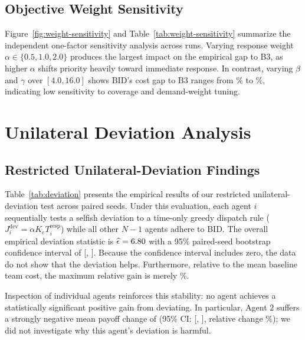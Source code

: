\documentclass{article}
\begin{document}
\subsection{Objective Weight Sensitivity}
Figure~\ref{fig:weight-sensitivity} and Table~\ref{tab:weight-sensitivity} summarize the independent one-factor sensitivity analysis across \NWeightRuns{} runs. Varying response weight $\alpha \in \{0.5, 1.0, 2.0\}$ produces the largest impact on the empirical gap to B3, as higher $\alpha$ shifts priority heavily toward immediate response. In contrast, varying $\beta$ and $\gamma$ over $[4.0, 16.0]$ shows BID's cost gap to B3 ranges from \BetaGammaMinGapPercent\% to \BetaGammaMaxGapPercent\%, indicating low sensitivity to coverage and demand-weight tuning.


%




\section{Unilateral Deviation Analysis}
\subsection{Restricted Unilateral-Deviation Findings}
Table~\ref{tab:deviation} presents the empirical results of our restricted unilateral-deviation test across \NScenarioSeeds{} paired seeds. Under this evaluation, each agent $i$ sequentially tests a selfish deviation to a time-only greedy dispatch rule ($J_i^{\mathrm{dev}} = \alpha K_e T_i^{\mathrm{resp}}$) while all other $N-1$ agents adhere to BID. The overall empirical deviation statistic is $\widehat{\epsilon} = 6.80{}$ with a 95\% paired-seed bootstrap confidence interval of [\DeviationMeanCILow, \DeviationMeanCIHigh]. Because the confidence interval includes zero, the data do not show that the deviation helps. Furthermore, relative to the mean baseline team cost, the maximum relative gain is merely \DeviationRelativeGainPercent\%.

Inspection of individual agents reinforces this stability: no agent achieves a statistically significant positive gain from deviating. In particular, Agent 2 suffers a strongly negative mean payoff change of \AgentTwoDeviationMean{} (95\% CI: [\AgentTwoDeviationCILow, \AgentTwoDeviationCIHigh], relative change \AgentTwoRelativeGainPercent\%); we did not investigate why this agent's deviation is harmful.
\end{document}
